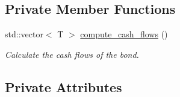 \subsection*{Private Member Functions}
\begin{DoxyCompactItemize}
\item 
std\+::vector$<$ T $>$ \hyperlink{classbond_1_1_bond_ae15acd8a6acd9674b4fd62796baf6e3c}{compute\+\_\+cash\+\_\+flows} ()
\begin{DoxyCompactList}\small\item\em Calculate the cash flows of the bond. \end{DoxyCompactList}\end{DoxyCompactItemize}
\subsection*{Private Attributes}

